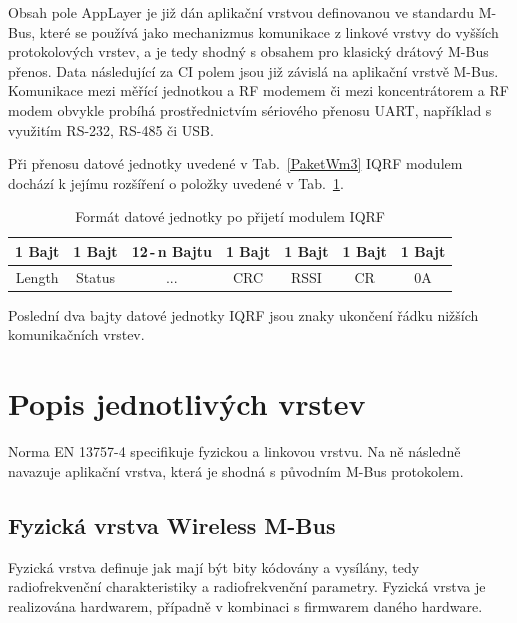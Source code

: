 Obsah pole AppLayer je již dán aplikační vrstvou definovanou ve standardu M-Bus, které se používá jako mechanizmus komunikace z linkové vrstvy do vyšších protokolových vrstev, a je tedy shodný s obsahem pro klasický drátový M-Bus přenos.  Data následující za CI polem jsou již závislá na aplikační vrstvě M-Bus. Komunikace mezi měřící jednotkou a RF modemem či mezi koncentrátorem a RF modem obvykle probíhá prostřednictvím sériového přenosu UART, například s využitím RS-232, RS-485 či USB.

Při přenosu datové jednotky uvedené v Tab.~\ref{PaketWm3} IQRF modulem dochází k jejímu rozšíření o položky uvedené v Tab.~\ref{PaketWm4}.

\begin{table}[!h]
\centering
\begin{tabular}{ccccccc}
1 Bajt & 1 Bajt & 12\,-\,n Bajtu & 1 Bajt & 1 Bajt & 1 Bajt & 1 Bajt\\ \hline
\multicolumn{1}{|c|}{Length} & \multicolumn{1}{c|}{Status} & \multicolumn{1}{c|}{...} & \multicolumn{1}{c|}{CRC} & \multicolumn{1}{c|}{RSSI} & \multicolumn{1}{c|}{CR} & \multicolumn{1}{c|}{0A}\\ \hline
\end{tabular}
\caption{Formát datové jednotky po přijetí modulem IQRF}
\label{PaketWm4}
\end{table}
\vspace{-10pt}

Poslední dva bajty datové jednotky IQRF jsou znaky ukončení řádku nižších komunikačních vrstev.




\section{Popis jednotlivých vrstev}

Norma EN 13757-4 specifikuje fyzickou a linkovou vrstvu. Na ně následně navazuje aplikační vrstva, která je shodná s původním M-Bus protokolem.

\subsection{Fyzická vrstva Wireless M-Bus}
Fyzická vrstva definuje jak mají být bity kódovány a vysílány, tedy radiofrekvenční charakteristiky a radiofrekvenční parametry. Fyzická vrstva je realizována hardwarem, případně v kombinaci s firmwarem daného hardware.

